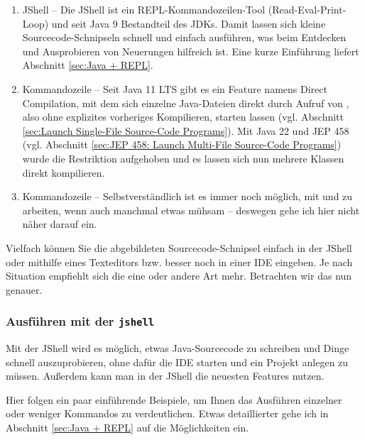 \begin{enumerate}
\item JShell -- Die JShell ist  ein REPL-Kommandozeilen-Tool (Read-Eval-Print-Loop)
          und seit Java 9 	Bestandteil des JDKs. Damit lassen sich kleine  Sourcecode-Schnipseln schnell und einfach
          ausführen, was beim Entdecken und Ausprobieren von Neuerungen hilfreich ist.
           Eine kurze Einführung liefert  Abschnitt \ref{sec:Java + REPL}.

\item Kommandozeile -- Seit Java 11 LTS gibt es ein Feature namens Direct Compilation, mit dem sich
		einzelne Java-Dateien direkt durch Aufruf von ,
		also ohne explizites vorheriges Kompilieren, starten lassen
		 (vgl. Abschnitt \ref{sec:Launch Single-File Source-Code Programs}).
		 		 Mit Java 22 und JEP 458 (vgl. Abschnitt \ref{sec:JEP 458: Launch Multi-File Source-Code
Programs}) wurde die Restriktion aufgehoben und es lassen sich nun mehrere Klassen direkt kompilieren.

\item Kommandozeile  -- Selbstverständlich ist es  immer noch möglich, mit  und  zu arbeiten,
         wenn auch manchmal etwas mühsam -- deswegen gehe ich hier nicht näher darauf ein.
\end{enumerate}


Vielfach können Sie die abgebildeten Sourcecode-Schnipsel einfach in der JShell oder mithilfe
eines Texteditors bzw. besser noch in einer IDE eingeben. Je nach Situation empfiehlt
sich die eine oder andere Art mehr. Betrachten wir das nun genauer.






\subsubsection{Ausführen mit der \texttt{jshell}}


Mit der JShell wird es möglich, etwas Java-Sourcecode zu schreiben und Dinge schnell auszuprobieren,
ohne dafür die IDE starten und ein Projekt anlegen zu müssen.
Außerdem kann man in der JShell die neuesten Features nutzen.


Hier folgen ein paar einführende Beispiele, um Ihnen das Ausführen einzelner oder weniger
Kommandos zu verdeutlichen.
Etwas detaillierter gehe ich in Abschnitt \ref{sec:Java + REPL} auf die Möglichkeiten ein.


